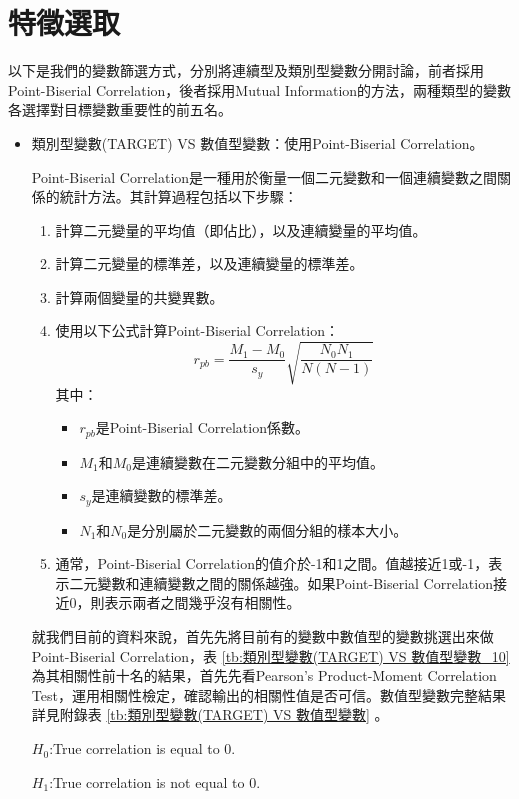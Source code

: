 \documentclass[12pt, a4paper]{article}
\begin{document}
\section{特徵選取}

以下是我們的變數篩選方式，分別將連續型及類別型變數分開討論，前者採用Point-Biserial Correlation，後者採用Mutual Information的方法，兩種類型的變數各選擇對目標變數重要性的前五名。



\begin{itemize}
\item 類別型變數(TARGET) VS 數值型變數：使用Point-Biserial Correlation。

Point-Biserial Correlation是一種用於衡量一個二元變數和一個連續變數之間關係的統計方法。其計算過程包括以下步驟：
\begin{enumerate}[-Step 1.]
\item 計算二元變量的平均值（即佔比），以及連續變量的平均值。
\item 計算二元變量的標準差，以及連續變量的標準差。
\item 計算兩個變量的共變異數。
\item 使用以下公式計算Point-Biserial Correlation：
$$r_{pb} = \frac{{M_1 - M_0}}{{s_y}} \sqrt{\frac{{N_0 N_1}}{{N (N - 1)}}}$$
其中：
\begin{itemize}
\item $r_{pb}$是Point-Biserial Correlation係數。
\item $M_1$和$M_0$是連續變數在二元變數分組中的平均值。
\item $s_y$是連續變數的標準差。
\item $N_1$和$N_0$是分別屬於二元變數的兩個分組的樣本大小。
\end{itemize}
\item 通常，Point-Biserial Correlation的值介於-1和1之間。值越接近1或-1，表示二元變數和連續變數之間的關係越強。如果Point-Biserial Correlation接近0，則表示兩者之間幾乎沒有相關性。
\end{enumerate}

就我們目前的資料來說，首先先將目前有的變數中數值型的變數挑選出來做Point-Biserial Correlation，表 \ref{tb:類別型變數(TARGET) VS 數值型變數_10} 為其相關性前十名的結果，首先先看Pearson's Product-Moment Correlation Test，運用相關性檢定，確認輸出的相關性值是否可信。數值型變數完整結果詳見附錄表 \ref{tb:類別型變數(TARGET) VS 數值型變數} 。

$H_0$:True correlation is equal to 0.

$H_1$:True correlation is not equal to 0.


\end{itemize}
\end{document}
